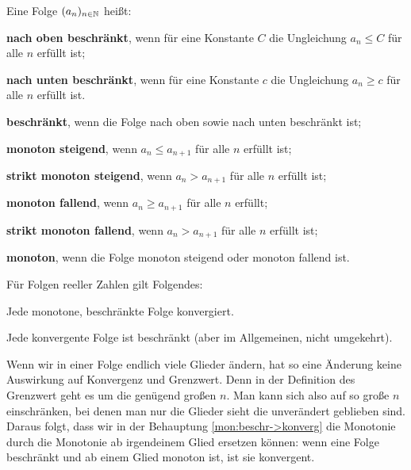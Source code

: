 \begin{defn} Eine Folge $(a_n)_{n \in \mathbb{N}}$ heißt: 
	\begin{enuma}
		\item \textbf{nach oben beschränkt}, wenn für eine Konstante $C$ die Ungleichung $a_n \le C$ für alle $n$ erfüllt ist;
		\item \textbf{nach unten beschränkt}, wenn für eine Konstante $c$ die Ungleichung $a_n \ge c$ für alle $n$ erfüllt ist. 
		\item \textbf{beschränkt}, wenn die Folge nach oben sowie nach unten beschränkt ist; 
		\item \textbf{monoton steigend}, wenn $a_n \le a_{n+1}$ für alle $n$ erfüllt ist;
		\item \textbf{strikt monoton steigend}, wenn $a_n > a_{n+1}$ für alle $n$ erfüllt ist;
		\item \textbf{monoton fallend}, wenn $a_n \ge a_{n+1}$ für alle $n$ erfüllt; 
		\item \textbf{strikt monoton fallend}, wenn $a_n > a_{n+1}$ für alle $n$ erfüllt ist; 
		\item \textbf{monoton}, wenn die Folge monoton steigend oder monoton fallend ist. 
	\end{enuma} 
\end{defn} 

\begin{thm} 
	\label{thm:monot:beschr:folgen} 
	Für Folgen reeller Zahlen gilt Folgendes: 
	\begin{enuma}
		\item \label{mon:beschr->konverg} Jede monotone, beschränkte Folge konvergiert. 
		\item Jede konvergente Folge ist beschränkt (aber im Allgemeinen, nicht umgekehrt). 
	\end{enuma} 
\end{thm} 

\begin{bem}
	Wenn wir in einer Folge endlich viele Glieder ändern, hat so eine Änderung keine Auswirkung auf Konvergenz und Grenzwert. Denn in der Definition des Grenzwert geht es um die genügend großen $n$. Man kann sich also auf so große $n$ einschränken, bei denen man nur die Glieder sieht die unverändert geblieben sind. Daraus folgt, dass wir 
	in der Behauptung \ref{mon:beschr->konverg} die Monotonie durch die Monotonie ab irgendeinem Glied ersetzen können: wenn eine Folge beschränkt und ab einem Glied monoton ist, ist sie konvergent. 
\end{bem} 

